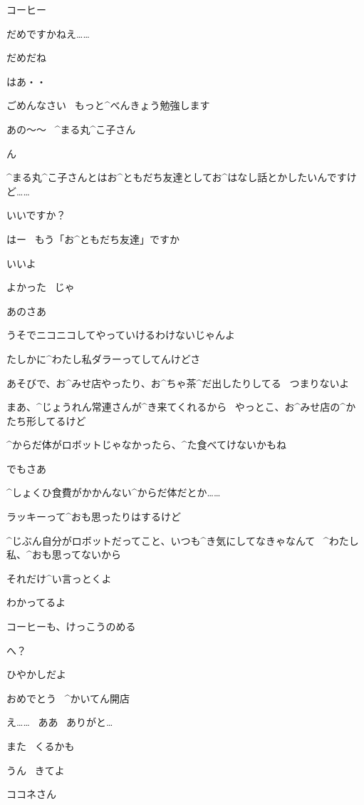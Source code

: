 \Alpha コーヒー

\Alpha だめですかねえ……

\Maruko だめだね

\Alpha はあ・・

\page
\Alpha ごめんなさい
\ もっと^{べんきょう}{勉強}します

\page
\Alpha あの〜〜
\ ^{まる}{丸}^{こ}{子}さん

\Maruko ん

\Alpha ^{まる}{丸}^{こ}{子}さんとはお^{ともだち}{友達}としてお^{はなし}{話}とかしたいんですけど……

\Alpha いいですか？

\Maruko はー
\ もう「お^{ともだち}{友達}」ですか

\Maruko いいよ

\Alpha よかった
\ じゃ

\page
\Alpha あのさあ

\Alpha うそでニコニコしてやっていけるわけないじゃんよ

\page
\Alpha たしかに^{わたし}{私}ダラーってしてんけどさ

\Alpha あそびで、お^{みせ}{店}やったり、お^{ちゃ}{茶}^{だ}{出}したりしてる
\ つまりないよ

\Alpha まあ、^{じょうれん}{常連}さんが^{き}{来}てくれるから
\ やっとこ、お^{みせ}{店}の^{かたち}{形}してるけど

\Alpha ^{からだ}{体}がロボットじゃなかったら、^{た}{食}べてけないかもね

\Alpha でもさあ

\page
\Alpha ^{しょくひ}{食費}がかかんない^{からだ}{体}だとか……

\Alpha ラッキーって^{おも}{思}ったりはするけど

\Alpha ^{じぶん}{自分}がロボットだってこと、いつも^{き}{気}にしてなきゃなんて
\ ^{わたし}{私}、^{おも}{思}ってないから

\Alpha それだけ^{い}{言}っとくよ

\page
\Maruko わかってるよ

\Maruko コーヒーも、けっこうのめる

\Alpha へ？

\page
\Maruko ひやかしだよ

\Maruko おめでとう
\ ^{かいてん}{開店}

\Alpha え……
\ ああ
\ ありがと…

\page
\Maruko また
\ くるかも

\Alpha うん
\ きてよ

\page
\Maruko ココネさん

